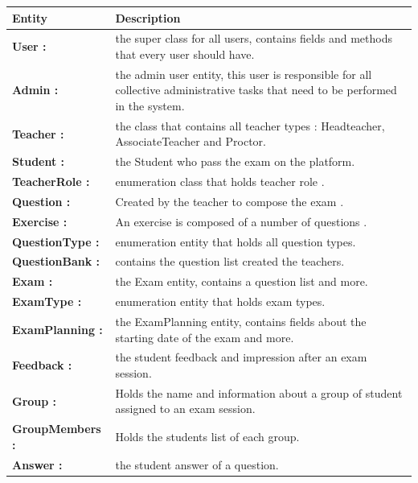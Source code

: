 \documentclass[]{uc2pfecaneva}
\begin{document}
\begin{table}
        \begin{tabularx}{\textwidth}{|l|X|}
            \hline
            Entity          & Description                                                                                              \\ \hline
            \textbf{User :} & the super class for all users, contains fields and methods that every user should have.\\ \hline
            \textbf{Admin :} & the admin user entity, this user is responsible for all collective administrative tasks that need to be performed in the system.\\ \hline
            \textbf{Teacher :} & the class that contains all teacher types : Headteacher, AssociateTeacher and Proctor.\\ \hline
            \textbf{Student :} & the Student who pass the exam on the platform.\\ \hline
            \textbf{TeacherRole :} & enumeration class that holds teacher role .\\ \hline
            \textbf{Question :} & Created by the teacher to compose the exam .\\ \hline
            \textbf{Exercise :} & An exercise is composed of a number of questions .\\ \hline
            \textbf{QuestionType :} & enumeration entity that holds all question types.\\ \hline
            \textbf{QuestionBank :} & contains the question list created the teachers.\\ \hline
            \textbf{Exam :} & the Exam entity, contains a question list and more.\\ \hline
            \textbf{ExamType :} & enumeration entity that holds exam types.\\ \hline
            \textbf{ExamPlanning :} & the ExamPlanning entity, contains fields about the starting date of the exam and more.\\ \hline
            \textbf{Feedback :} & the student feedback and impression after an exam session.\\ \hline
            \textbf{Group :} & Holds the name and information about a group of student assigned to an exam session.\\ \hline
            \textbf{GroupMembers :} & Holds the students list of each group.\\ \hline
            \textbf{Answer :} & the student answer of a question.\\ \hline

\end{tabularx}
\end{table}
\end{document}
